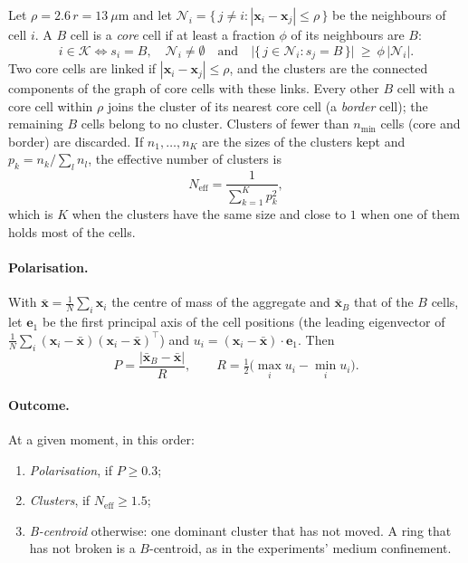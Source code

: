 \documentclass{article}
\begin{document}
    Let $\rho = 2.6\,r = 13~\mu$m and let $\mathcal{N}_i = \{\, j \neq i : |\mathbf{x}_i - \mathbf{x}_j| \le \rho \,\}$ be the neighbours of cell $i$. A $B$ cell is a \emph{core} cell if at least a fraction $\phi$ of its neighbours are $B$:
    \begin{equation*}
        i \in \mathcal{K} \iff s_i = B, \quad \mathcal{N}_i \neq \emptyset \quad \text{and} \quad \big|\{\, j \in \mathcal{N}_i : s_j = B \,\}\big| \ \ge\ \phi\, |\mathcal{N}_i| .
    \end{equation*}
    Two core cells are linked if $|\mathbf{x}_i - \mathbf{x}_j| \le \rho$, and the clusters are the connected components of the graph of core cells with these links. Every other $B$ cell with a core cell within $\rho$ joins the cluster of its nearest core cell (a \emph{border} cell); the remaining $B$ cells belong to no cluster. Clusters of fewer than $n_\text{min}$ cells (core and border) are discarded. If $n_1, \dots, n_K$ are the sizes of the clusters kept and $p_k = n_k / \sum_l n_l$, the effective number of clusters is
    \begin{equation*}
        N_\text{eff} = \frac{1}{\sum_{k=1}^K p_k^2} ,
    \end{equation*}
    which is $K$ when the clusters have the same size and close to $1$ when one of them holds most of the cells.

\paragraph{Polarisation.} 

    With $\bar{\mathbf{x}} = \frac1N \sum_i \mathbf{x}_i$ the centre of mass of the aggregate and $\bar{\mathbf{x}}_B$ that of the $B$ cells, let $\mathbf{e}_1$ be the first principal axis of the cell positions (the leading eigenvector of $\frac1N\sum_i (\mathbf{x}_i - \bar{\mathbf{x}})(\mathbf{x}_i - \bar{\mathbf{x}})^\top$) and $u_i = (\mathbf{x}_i - \bar{\mathbf{x}})\cdot\mathbf{e}_1$. Then
    \begin{equation*}
        P = \frac{|\bar{\mathbf{x}}_B - \bar{\mathbf{x}}|}{R}, \qquad R = \tfrac12\big(\max_i u_i - \min_i u_i\big) .
    \end{equation*}

\paragraph{Outcome.} 

    At a given moment, in this order:
    \begin{enumerate}
        \item \emph{Polarisation}, if $P \ge 0.3$;
        \item \emph{Clusters}, if $N_\text{eff} \ge 1.5$;
        \item \emph{B-centroid} otherwise: one dominant cluster that has not moved. A ring that has not broken is a $B$-centroid, as in the experiments' medium confinement.
    \end{enumerate}
\end{document}

